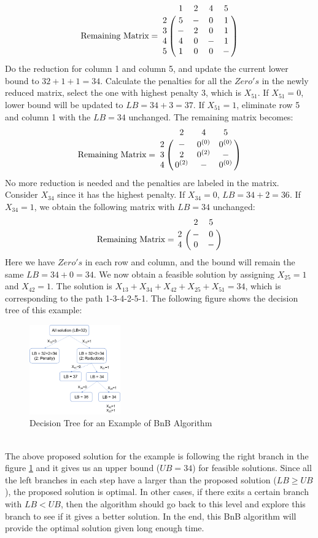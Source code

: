 $$
\text{Remaining Matrix} =  
\bordermatrix{
          & 1 & 2 & 4 & 5   \cr
    2     & 5 & - & 0 & 1   \cr
   	3 	  & - & 2 & 0 & 1   \cr
    4     & 4 & 0 & - & 1   \cr   
    5     & 1 & 0 & 0 & -   \cr
            }
$$
Do the reduction for column 1 and column 5, and update the current lower bound to $32+1+1=34$. Calculate the penalties for all the $Zero's$ in the newly reduced matrix, select the one with highest penalty 3, which is $X_{51}$. If $X_{51}=0$, lower bound will be updated to $LB = 34 +3 =37$. If $X_{51}=1$, eliminate row 5 and column 1 with the $LB = 34$ unchanged. The remaining matrix becomes:
$$
\text{Remaining Matrix} =    
\bordermatrix{
           & 2 & 4 & 5   \cr
    2      & - & 0^{(0)} & 0^{(0)}   \cr
   	3 	   & 2 & 0^{(2)} & -   \cr
    4      & 0^{(2)} & - & 0^{(0)}   \cr   
            }
$$
No more reduction is needed and the penalties are labeled in the matrix. Consider $X_{34}$ since it has the highest penalty. If $X_{34}=0$, $LB = 34+2=36$. If $X_{34}=1$, we obtain the following matrix with $LB = 34$ unchanged:
$$
\text{Remaining Matrix} =    
\bordermatrix{
           & 2 & 5   \cr
    2      & -  & 0   \cr
    4      & 0  & -   \cr   }
$$
Here we have $Zero's$ in each row and column, and the bound will remain the same $LB= 34+0=34$. We now obtain a feasible solution by assigning $X_{25}=1$ and $X_{42}=1$. The solution is $X_{13}+X_{34}+X_{42}+X_{25}+X_{51}=34$, which is corresponding to the path 1-3-4-2-5-1.
The following figure shows the decision tree of this example:\\ 
\begin{figure}[h]
    \centering
    \includegraphics[width=0.35\textwidth]{Bnb-example}
    \caption{Decision Tree for an Example of BnB Algorithm}
    \label{fig:Bnb}
\end{figure}
\\
The above proposed solution for the example is following the right branch in the figure \ref{fig:Bnb} and it gives us an upper bound ($UB = 34$) for feasible solutions. Since all the left branches in each step have a larger than the proposed solution ($LB \geq UB$), the proposed solution is optimal. In other cases, if there exits a certain branch with $LB < UB$, then the algorithm should go back to this level and explore this branch to see if it gives a better solution. In the end, this BnB algorithm will provide the optimal solution given long enough time. 
